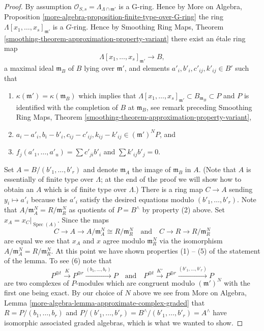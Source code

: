 \documentclass[10pt,a4paper]{amsart}
\theoremstyle{plain}
\theoremstyle{definition}
\theoremstyle{remark}
\numberwithin{equation}{subsection}
\def\Spec{\mathop{\mathrm{Spec}}}
\begin{document}
\begin{proof}
\medskip\noindent
By assumption $\mathcal{O}_{S, s} = \Lambda_{\Lambda \cap \mathfrak m'}$ is
a G-ring. Hence by More on Algebra, Proposition
\ref{more-algebra-proposition-finite-type-over-G-ring}
the ring $\Lambda[x_1, \ldots, x_s]_{\mathfrak m'}$ is a $G$-ring.
Hence by Smoothing Ring Maps, Theorem
\ref{smoothing-theorem-approximation-property-variant}
there exist an \'etale ring map
$$
\Lambda[x_1, \ldots, x_s]_{\mathfrak m'} \to B,
$$
a maximal ideal $\mathfrak m_B$ of $B$ lying over $\mathfrak m'$, and
elements $a'_i, b'_i, c'_{ij}, k'_{ij} \in B'$ such that
\begin{enumerate}
\item $\kappa(\mathfrak m') = \kappa(\mathfrak m_B)$ which implies
that $\Lambda[x_1, \ldots, x_s]_{\mathfrak m'} \subset B_{\mathfrak m_B}
\subset P$ and $P$ is identified with the completion of $B$ at
$\mathfrak m_B$, see remark preceding Smoothing Ring Maps, Theorem
\ref{smoothing-theorem-approximation-property-variant},
\item $a_i - a'_i, b_i - b'_i, c_{ij} - c'_{ij}, k_{ij} - k'_{ij} \in
(\mathfrak m')^N P$, and
\item $f_j(a'_1, \ldots, a'_u) = \sum c'_{ji} b'_i$ and $\sum k'_{ij}b'_j = 0$.
\end{enumerate}
Set $A = B/(b'_1, \ldots, b'_r)$ and denote $\mathfrak m_A$ the
image of $\mathfrak m_B$ in $A$. (Note that $A$ is essentially of finite
type over $\Lambda$; at the end of the proof we will show how to obtain
an $A$ which is of finite type over $\Lambda$.) There is a ring map
$C \to A$ sending $y_i \mapsto a'_i$ because the $a'_i$ satisfy
the desired equations modulo $(b'_1, \ldots, b'_r)$.
Note that $A/\mathfrak m_A^N = R/\mathfrak m_R^N$ as quotients of
$P = B^\wedge$ by property (2) above. Set $x_A = x_C|_{\Spec(A)}$.
Since the maps
$$
C \to A \to A/\mathfrak m_A^N \cong R/\mathfrak m_R^N
\quad\text{and}\quad
C \to R \to R/\mathfrak m_R^N
$$
are equal we see that $x_A$ and $x$ agree modulo $\mathfrak m_R^N$
via the isomorphism $A/\mathfrak m_A^N = R/\mathfrak m_R^N$. At this
point we have shown properties (1) -- (5) of the statement of the lemma.
To see (6) note that
$$
P^{\oplus t} \xrightarrow{K}
P^{\oplus r} \xrightarrow{(b_1, \ldots, b_r)}
P
\quad\text{and}\quad
P^{\oplus t} \xrightarrow{K'}
P^{\oplus r} \xrightarrow{(b'_1, \ldots, b'_r)}
P
$$
are two complexes of $P$-modules which are congruent modulo
$(\mathfrak m')^N$ with the first one being exact. By our choice of $N$
above we see from
More on Algebra, Lemma \ref{more-algebra-lemma-approximate-complex-graded}
that $R = P/(b_1, \ldots, b_r)$ and
$P/(b'_1, \ldots, b'_r) = B^\wedge/(b'_1, \ldots, b'_r) = A^\wedge$
have isomorphic associated graded algebras, which is what we wanted to show.


\end{proof}
\end{document}
